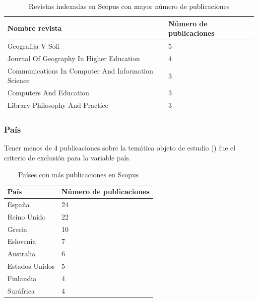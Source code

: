 \documentclass[spanish]{textolivre}
\begin{document}
\begin{table}[h!]
\centering
\begin{threeparttable}
\caption{Revistas indexadas en Scopus con mayor número de publicaciones}
\label{tab3}
\begin{tabular}{ll}
\toprule
Nombre revista                                     & Número de publicaciones \\
\midrule
Geografija V Soli                                  & 5                       \\
Journal Of Geography In Higher Education           & 4                       \\
Communications In Computer And Information Science & 3                       \\
Computers And Education                            & 3                       \\
Library Philosophy And Practice                    & 3                       \\
\bottomrule
\end{tabular}
\end{threeparttable}
\end{table}

\subsubsection{País}

Tener menos de 4 publicaciones sobre la temática objeto de estudio () fue el criterio de exclusión para la variable país.

\begin{table}[h!]
\centering
\begin{threeparttable}
\caption{Países con más publicaciones en Scopus}
\label{tab4}
\begin{tabular}{ll}
\toprule
País           & Número de publicaciones \\
\midrule
España         & 24                      \\
Reino Unido    & 22                      \\
Grecia         & 10                      \\
Eslovenia      & 7                       \\
Australia      & 6                       \\
Estados Unidos & 5                       \\
Finlandia      & 4                       \\
Suráfrica      & 4                       \\
\bottomrule
\end{tabular}
\end{threeparttable}
\end{table}
\end{document}

